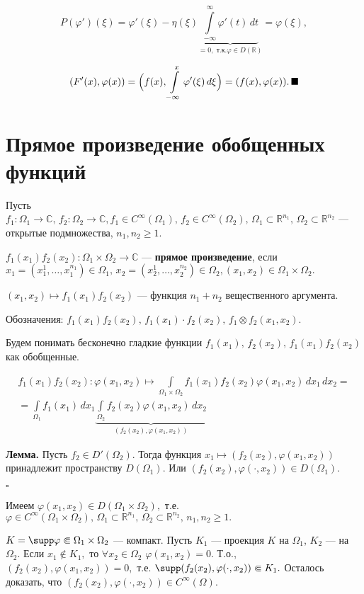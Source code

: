 \documentclass[12pt,a4paper,draft]{article}
\DeclareRobustCommand*{\т}{~--- }
\DeclareRobustCommand*{\ч}{~-- }
\begin{document}
$$P(\varphi')(\xi)=\varphi'(\xi)-\eta(\xi)\underbrace{\int\limits_{-\infty}^{\infty}\varphi'(t)\,dt}_{=0,\mbox{ т.к.} \varphi\in D(\mathbb R)}=\varphi(\xi),$$

$$(F'(x),\varphi(x))=\Bigl(f(x),\int\limits_{-\infty}^x
\varphi'(\xi)\,d\xi\Bigr)=(f(x),\varphi(x)).\,\blacksquare$$

\section{Прямое произведение обобщенных функций}

Пусть $f_1\colon \Omega_1\to \mathbb C,\,f_2\colon \Omega_2\to
\mathbb C, f_1\in C^{\infty}(\Omega_1),\,f_2\in
C^{\infty}(\Omega_2),\,\Omega_1\subset\mathbb
R^{n_1},\,\Omega_2\subset\mathbb R^{n_2}$ --- открытые
подмножества, $n_1,n_2\ge1.$

$f_1(x_1)f_2(x_2)\colon \Omega_1\times\Omega_2\to \mathbb C$ ---
\textbf{прямое произведение}, если
$x_1=(x_1^1,\ldots,x_1^{n_1})\in\Omega_1,\,x_2=(x_2^1,\ldots,x_2^{n_2})\in\Omega_2,
(x_1,x_2)\in \Omega_1\times\Omega_2.$

$(x_1,x_2)\mapsto f_1(x_1)f_2(x_2)$ --- функция $n_1+n_2$
вещественного аргумента.

Обозначения: $f_1(x_1)f_2(x_2),\,f_1(x_1)\cdot
f_2(x_2),\,f_1\otimes f_2(x_1,x_2).$

Будем понимать бесконечно гладкие функции
$f_1(x_1),\,f_2(x_2),\,f_1(x_1)f_2(x_2)$ как обобщенные.

\begin{multline}
f_1(x_1)f_2(x_2)\colon \varphi(x_1,x_2)\mapsto
\int\limits_{\Omega_1\times\Omega_2}f_1(x_1)f_2(x_2)\varphi(x_1,x_2)\,dx_1\,dx_2=\\=
\int\limits_{\Omega_1}f_1(x_1)\,dx_1
\underbrace{\int\limits_{\Omega_2}f_2(x_2)\varphi(x_1,x_2)\,dx_2}_{(f_2(x_2),\varphi(x_1,x_2))}
\end{multline}

\textbf{Лемма.} Пусть $f_2\in D'(\Omega_2).$ Тогда функция
$x_1\mapsto (f_2(x_2),\varphi(x_1,x_2))$ принадлежит пространству
$D(\Omega_1).$ Или $(f_2(x_2),\varphi(\cdot,x_2))\in D(\Omega_1).$

$\square$

Имеем $\varphi(x_1,x_2) \in D(\Omega_1\times\Omega_2),$ т.е.
$\varphi\in  C^{\infty}(\Omega_1\times\Omega_2),\,
\Omega_1\subset\mathbb R^{n_1},\,\Omega_2\subset\mathbb
R^{n_2},\,n_1,n_2\ge1.$

$K=\supp \varphi\Subset\Omega_1\times\Omega_2$ --- компакт. Пусть
$K_1$ --- проекция $K$ на $\Omega_1$, $K_2$ --- на $\Omega_2$.
Если $x_1\notin K_1,$ то $\forall
x_2\in\Omega_2\,\,\varphi(x_1,x_2)=0.$ Т.о.,
$(f_2(x_2),\varphi(x_1,x_2))=0,$ т.е. $\supp
(f_2(x_2),\varphi(\cdot,x_2))\Subset K_1.$ Осталось доказать, что
$(f_2(x_2),\varphi(\cdot,x_2))\in C^{\infty}(\Omega).$
\end{document}
